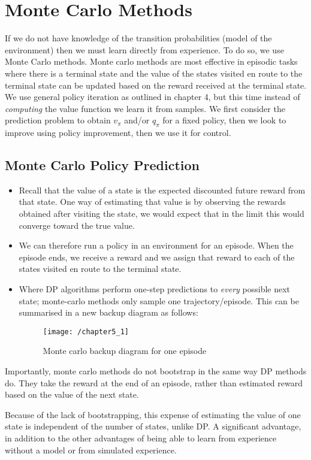 \section{Monte Carlo Methods}
If we do not have knowledge of the transition probabilities (model of the environment) then we must learn directly from experience. To do so, we use Monte Carlo methods. Monte carlo methods are most effective in episodic tasks where there is a terminal state and the value of the states visited en route to the terminal state can be updated based on the reward received at the terminal state. We use general policy iteration as outlined in chapter 4, but this time instead of \textit{computing} the value function we learn it from samples. We first consider the prediction problem to obtain $v_\pi$ and/or \textbf{$q_\pi$} for a fixed policy, then we look to improve using policy improvement, then we use it for control.  

\subsection{Monte Carlo Policy Prediction}
\begin{itemize}
\item Recall that the value of a state is the expected discounted future reward from that state. One way of estimating that value is by observing the rewards obtained after visiting the state, we would expect that in the limit this would converge toward the true value.
\item We can therefore run a policy in an environment for an episode. When the episode ends, we receive a reward and we assign that reward to each of the states visited en route to the terminal state. 
\item Where DP algorithms perform one-step predictions to \textit{every} possible next state; monte-carlo methods only sample one trajectory/episode. This can be summarised in a new backup diagram as follows:
\begin{figure}[h!]
	\centering
	\texttt{[image: /chapter5\_1]}
	\caption{Monte carlo backup diagram for one episode}
	\label{fig:monte carlo backup}
\end{figure}
\end{itemize}
\item Importantly, monte carlo methods do not bootstrap in the same way DP methods do. They take the reward at the end of an episode, rather than estimated reward based on the value of the next state.
\item Because of the lack of bootstrapping, this expense of estimating the value of one state is independent of the number of states, unlike DP. A significant advantage, in addition to the other advantages of being able to learn from experience without a model or from simulated experience. 

